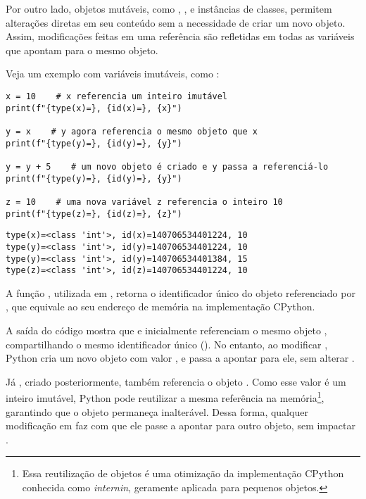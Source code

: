 Por outro lado, objetos mutáveis, como , ,  e instâncias de classes, permitem
alterações diretas em seu conteúdo sem a necessidade de criar um novo objeto.
Assim, modificações feitas em uma referência são refletidas em todas as variáveis que apontam para o mesmo objeto.

Veja um exemplo com variáveis imutáveis, como :
\begin{verbatim}
x = 10    # x referencia um inteiro imutável
print(f"{type(x)=}, {id(x)=}, {x}")

y = x    # y agora referencia o mesmo objeto que x
print(f"{type(y)=}, {id(y)=}, {y}")

y = y + 5    # um novo objeto é criado e y passa a referenciá-lo
print(f"{type(y)=}, {id(y)=}, {y}")

z = 10    # uma nova variável z referencia o inteiro 10
print(f"{type(z)=}, {id(z)=}, {z}")
\end{verbatim}
\begin{verbatim}
type(x)=<class 'int'>, id(x)=140706534401224, 10
type(y)=<class 'int'>, id(y)=140706534401224, 10
type(y)=<class 'int'>, id(y)=140706534401384, 15
type(z)=<class 'int'>, id(z)=140706534401224, 10
\end{verbatim}

A função , utilizada em , retorna o identificador único do objeto referenciado
por , que equivale ao seu endereço de memória na implementação CPython.

A saída do código mostra que  e  inicialmente referenciam o mesmo objeto ,
compartilhando o mesmo identificador único (). No entanto, ao modificar , Python cria um novo
objeto com valor , e  passa a apontar para ele, sem alterar .


Já , criado posteriormente, também referencia o objeto .
Como esse valor é um inteiro imutável, Python pode reutilizar a mesma referência na
memória\footnote{Essa reutilização de objetos é uma otimização da implementação CPython conhecida como
\emph{internin}, geramente aplicada para pequenos objetos.}, garantindo que o
objeto permaneça inalterável.
Dessa forma, qualquer modificação em  faz com que ele passe a apontar para outro objeto, sem
impactar .


